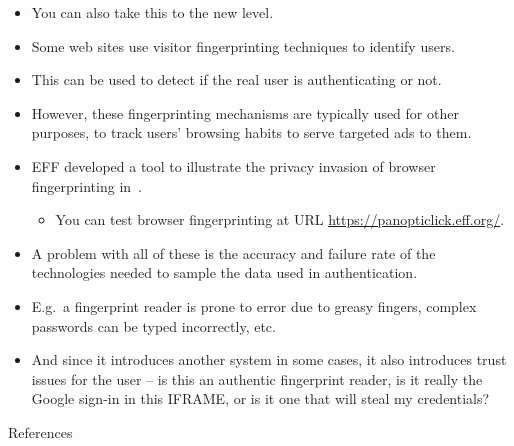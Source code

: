 \documentclass{beamer}
\begin{document}
\begin{frame}
  \begin{itemize}
    \item You can also take this to the new level.

    \item Some web sites use visitor fingerprinting techniques to identify 
      users.

    \item This can be used to detect if the real user is authenticating or not.

    \item However, these fingerprinting mechanisms are typically used for other 
      purposes, to track users' browsing habits to serve targeted ads to them.

    \item EFF developed a tool to illustrate the privacy invasion of browser 
      fingerprinting in~\cite{Eckersley2010hui}.
      \begin{itemize}
        \item You can test browser fingerprinting at URL 
          \url{https://panopticlick.eff.org/}.
      \end{itemize}

  \end{itemize}
\end{frame}

\begin{frame}
  \begin{itemize}
    \item A problem with all of these is the accuracy and failure rate of the 
      technologies needed to sample the data used in authentication.

    \item E.g.\ a fingerprint reader is prone to error due to greasy fingers, 
      complex passwords can be typed incorrectly, etc.

    \item And since it introduces another system in some cases, it also 
      introduces trust issues for the user -- is this an authentic fingerprint 
      reader, is it really the Google sign-in in this IFRAME, or is it one that 
      will steal my credentials?

  \end{itemize}
\end{frame}




\begin{frame}{References}
	\small
  \printbibliography{}
\end{frame}
\end{document}
